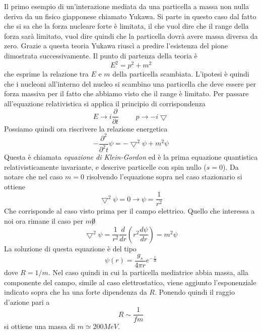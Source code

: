 Il primo esempio di un'interazione mediata da una particella a massa non nulla deriva da un fisico giapponese chiamato Yukawa.
Si parte in questo caso dal fatto che si sa che la forza nucleare forte è limitata, il che vuol dire che il range della forza sarà limitato, vuol dire quindi che la particella dovrà avere massa diversa da zero.
Grazie a questa teoria Yukawa riuscì a predire l'esistenza del pione dimostrata successivamente.
Il punto di partenza della teoria è
\begin{equation}
E^2=p^2+m^2
\end{equation}
che esprime la relazione tra $E$ e $m$ della particella scambiata.
L'ipotesi è quindi che i nucleoni all'interno del nucleo si scambino una particella che deve essere per forza massiva per il fatto che abbiamo visto che il range è limitato.
Per passare all'equazione relativistica si applica il principio di corrispondenza
\begin{equation}
E\to i\frac{\partial}{\partial t}\hspace{1cm} p \to -i\bigtriangledown
\end{equation}
Possiamo quindi ora riscrivere la relazione energetica
\begin{equation}
-\frac{\partial^2}{\partial^2 t}\psi=-\bigtriangledown^2\psi+m^2\psi
\end{equation}
Questa è chiamata \emph{equazione di Klein-Gordon} ed è la prima equazione quantistica relativisticamente invariante, e descrive particelle con spin nullo ($s=0$).
Da notare che nel caso $m=0$ risolvendo l'equazione sopra nel caso stazionario si ottiene 
\begin{equation}
\bigtriangledown^2\psi=0 \to \psi=\frac{1}{r^2}
\end{equation}
Che corrisponde al caso visto prima per il campo elettrico.
Quello che interessa a noi ora rimane il caso per $m\not 0$
\begin{equation}
\bigtriangledown^2\psi =\frac{1}{r^2}\frac{d}{dr}\left(r^2 \frac{d\psi}{dr}\right)=m^2\psi
\end{equation}
La soluzione di questa equazione è del tipo
\begin{equation}
\psi(r)=\frac{g_s}{4\pi r}e^{-\frac{r}{R}}
\end{equation}
dove $R=1/m$. 
Nel caso quindi in cui la particella mediatrice abbia massa, alla componente del campo, simile al caso elettrostatico, viene aggiunto l'esponenziale indicato sopra che ha una forte dipendenza da $R$.
Ponendo quindi il raggio d'azione pari a 
\begin{equation}
R\sim \frac{1}{fm}
\end{equation}
si ottiene una massa di $m\simeq 200MeV$.

